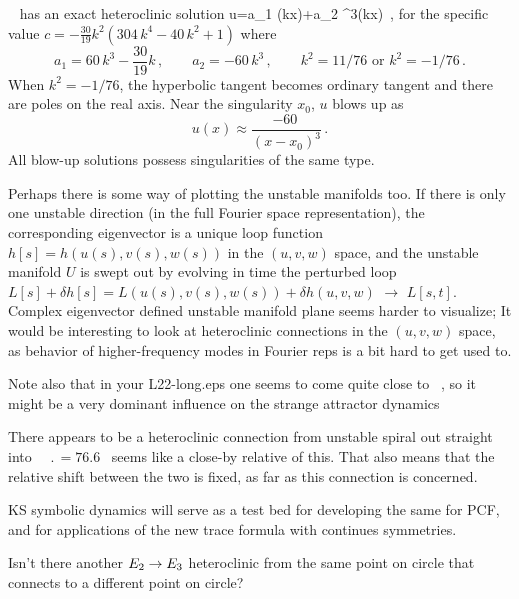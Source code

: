 \KSe\  has an exact heteroclinic solution
\beq
u=a_1 \tanh(kx)+a_2 \tanh^3(kx)
\label{eq:ksexa} 
\,,
\eeq
for the specific value $c=-\frac{30}{19}k^2(304\,k^4-40\,k^2+1)$ where 
\[
a_1=60\,k^3-\frac{30}{19}k
    \,,\qquad
a_2=-60\,k^3
    \,,\qquad
k^2=11/76 \mbox{ or } 
k^2=-1/76
\,.
\]
When $k^2=-1/76$, the hyperbolic tangent becomes ordinary tangent and there are poles on
the real axis. Near the singularity $x_0$, $u$ blows up as
\[
u(x) \approx \frac{-60~}{(x-x_0)^3}
\,.
\]
All blow-up solutions possess singularities of the same type.

\bigskip

Perhaps there is some way of plotting the unstable manifolds too. If
there is only one unstable direction (in the full Fourier space
representation), the corresponding eigenvector is a unique loop function
$h[s] =  h(u(s),v(s),w(s))$ in the $(u,v,w)$ space, and the unstable manifold
$U$ is swept out by evolving in time the perturbed loop 
$L[s] + \delta h[s] =  L(u(s),v(s),w(s)) + \delta h(u,v,w)$
$\to$ $L[s,t]$.
Complex eigenvector defined unstable manifold plane seems
harder to visualize;  It would be interesting
to look at heteroclinic connections in the $(u,v,w)$ space, as
behavior of higher-frequency modes in Fourier reps is a bit
hard to get used to.

\bigskip

Note also that in your L22-long.eps one seems
to come quite close to ~\eqv, so it might be a very dominant
influence on the strange attractor dynamics


There appears to be a heteroclinic connection from 
{\eqv}
unstable spiral out straight into ~{\eqv}
$\period{} = 76.6$ \rpo\ seems like a close-by
relative of this.
That also means that the relative shift between the two {\eqva} is
fixed, as far as this connection is concerned.

KS symbolic dynamics will
serve as a test bed for developing the
same for PCF, and for applications of the new
trace formula with continues symmetries.

%
Isn't there another $ E_{2} \to E_{3} $ heteroclinic
from the same point on   circle that connects to a different point on
 circle?


\bigskip

